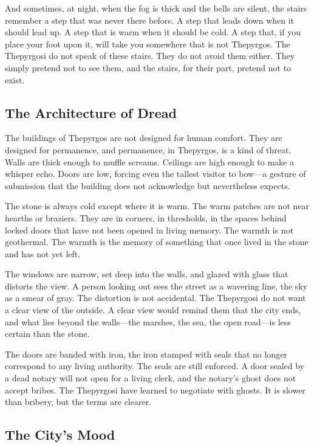 \documentclass[10pt,twocolumn]{book}
\begin{document}
And sometimes, at night, when the fog is thick and the bells are silent, the stairs remember a step that was never there before. A step that leads down when it should lead up. A step that is warm when it should be cold. A step that, if you place your foot upon it, will take you somewhere that is not Thepyrgos. The Thepyrgosi do not speak of these stairs. They do not avoid them either. They simply pretend not to see them, and the stairs, for their part, pretend not to exist.

\subsection{The Architecture of Dread}

The buildings of Thepyrgos are not designed for human comfort. They are designed for permanence, and permanence, in Thepyrgos, is a kind of threat. Walls are thick enough to muffle screams. Ceilings are high enough to make a whisper echo. Doors are low, forcing even the tallest visitor to bow---a gesture of submission that the building does not acknowledge but nevertheless expects.

The stone is always cold except where it is warm. The warm patches are not near hearths or braziers. They are in corners, in thresholds, in the spaces behind locked doors that have not been opened in living memory. The warmth is not geothermal. The warmth is the memory of something that once lived in the stone and has not yet left.

The windows are narrow, set deep into the walls, and glazed with glass that distorts the view. A person looking out sees the street as a wavering line, the sky as a smear of gray. The distortion is not accidental. The Thepyrgosi do not want a clear view of the outside. A clear view would remind them that the city ends, and what lies beyond the walls---the marshes, the sea, the open road---is less certain than the stone.

The doors are banded with iron, the iron stamped with seals that no longer correspond to any living authority. The seals are still enforced. A door sealed by a dead notary will not open for a living clerk, and the notary's ghost does not accept bribes. The Thepyrgosi have learned to negotiate with ghosts. It is slower than bribery, but the terms are clearer.

\subsection{The City's Mood}
\end{document}
